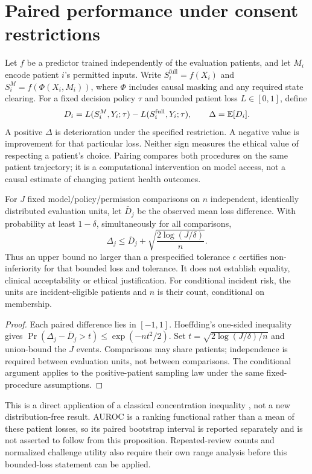 \section*{Paired performance under consent restrictions}
Let $f$ be a predictor trained independently of the evaluation patients, and let $M_i$ encode patient $i$'s permitted inputs. Write $S_i^{\mathrm{full}}=f(X_i)$ and $S_i^{M}=f(\Phi(X_i,M_i))$, where $\Phi$ includes causal masking and any required state clearing. For a fixed decision policy $\tau$ and bounded patient loss $L\in[0,1]$, define
\[
 D_i=L(S_i^M,Y_i;\tau)-L(S_i^{\mathrm{full}},Y_i;\tau),
 \qquad \Delta=\mathbb E[D_i].
\]
A positive $\Delta$ is deterioration under the specified restriction. A negative value is improvement for that particular loss. Neither sign measures the ethical value of respecting a patient's choice. Pairing compares both procedures on the same patient trajectory; it is a computational intervention on model access, not a causal estimate of changing patient health outcomes.

\begin{proposition}
For $J$ fixed model/policy/permission comparisons on $n$ independent, identically distributed evaluation units, let $\bar D_j$ be the observed mean loss difference. With probability at least $1-\delta$, simultaneously for all comparisons,
\[
 \Delta_j\le \bar D_j+
 \sqrt{\frac{2\log(J/\delta)}{n}}.
\]
Thus an upper bound no larger than a prespecified tolerance $\epsilon$ certifies non-inferiority for that bounded loss and tolerance. It does not establish equality, clinical acceptability or ethical justification. For conditional incident risk, the units are incident-eligible patients and $n$ is their count, conditional on membership.
\end{proposition}
\begin{proof}
Each paired difference lies in $[-1,1]$. Hoeffding's one-sided inequality gives $\Pr(\Delta_j-\bar D_j>t)\le\exp(-nt^2/2)$. Set $t=\sqrt{2\log(J/\delta)/n}$ and union-bound the $J$ events. Comparisons may share patients; independence is required between evaluation units, not between comparisons. The conditional argument applies to the positive-patient sampling law under the same fixed-procedure assumptions.
\end{proof}
This is a direct application of a classical concentration inequality \citep{hoeffding}, not a new distribution-free result. AUROC is a ranking functional rather than a mean of these patient losses, so its paired bootstrap interval is reported separately and is not asserted to follow from this proposition. Repeated-review counts and normalized challenge utility also require their own range analysis before this bounded-loss statement can be applied.
